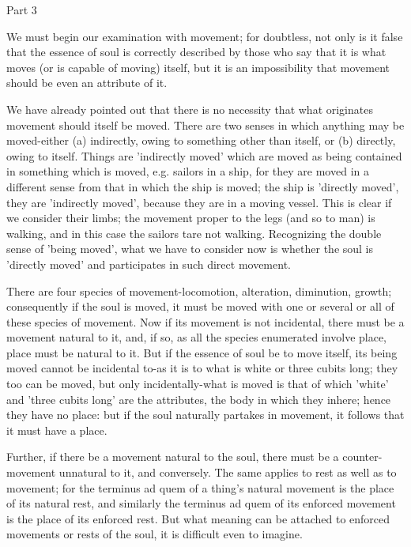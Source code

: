 Part 3

We must begin our examination with movement; for doubtless, not only
is it false that the essence of soul is correctly described by those
who say that it is what moves (or is capable of moving) itself, but
it is an impossibility that movement should be even an attribute of
it. 

We have already pointed out that there is no necessity that what originates
movement should itself be moved. There are two senses in which anything
may be moved-either (a) indirectly, owing to something other than
itself, or (b) directly, owing to itself. Things are 'indirectly moved'
which are moved as being contained in something which is moved, e.g.
sailors in a ship, for they are moved in a different sense from that
in which the ship is moved; the ship is 'directly moved', they are
'indirectly moved', because they are in a moving vessel. This is clear
if we consider their limbs; the movement proper to the legs (and so
to man) is walking, and in this case the sailors tare not walking.
Recognizing the double sense of 'being moved', what we have to consider
now is whether the soul is 'directly moved' and participates in such
direct movement. 

There are four species of movement-locomotion, alteration, diminution,
growth; consequently if the soul is moved, it must be moved with one
or several or all of these species of movement. Now if its movement
is not incidental, there must be a movement natural to it, and, if
so, as all the species enumerated involve place, place must be natural
to it. But if the essence of soul be to move itself, its being moved
cannot be incidental to-as it is to what is white or three cubits
long; they too can be moved, but only incidentally-what is moved is
that of which 'white' and 'three cubits long' are the attributes,
the body in which they inhere; hence they have no place: but if the
soul naturally partakes in movement, it follows that it must have
a place. 

Further, if there be a movement natural to the soul, there must be
a counter-movement unnatural to it, and conversely. The same applies
to rest as well as to movement; for the terminus ad quem of a thing's
natural movement is the place of its natural rest, and similarly the
terminus ad quem of its enforced movement is the place of its enforced
rest. But what meaning can be attached to enforced movements or rests
of the soul, it is difficult even to imagine. 

